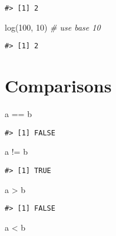 \documentclass[
]{book}
\newenvironment{Shaded}{\begin{snugshade}}{\end{snugshade}}
\newcommand{\CommentTok}[1]{\textcolor[rgb]{0.56,0.35,0.01}{\textit{#1}}}
\newcommand{\DecValTok}[1]{\textcolor[rgb]{0.00,0.00,0.81}{#1}}
\newcommand{\FunctionTok}[1]{\textcolor[rgb]{0.00,0.00,0.00}{#1}}
\newcommand{\NormalTok}[1]{#1}
\newcommand{\SpecialCharTok}[1]{\textcolor[rgb]{0.00,0.00,0.00}{#1}}
\begin{document}
\begin{verbatim}
#> [1] 2
\end{verbatim}

\begin{Shaded}
\begin{Highlighting}[]
\FunctionTok{log}\NormalTok{(}\DecValTok{100}\NormalTok{, }\DecValTok{10}\NormalTok{) }\CommentTok{\# use base 10}
\end{Highlighting}
\end{Shaded}

\begin{verbatim}
#> [1] 2
\end{verbatim}

\hypertarget{comparisons}{%
\section{Comparisons}\label{comparisons}}

\begin{Shaded}
\begin{Highlighting}[]
\NormalTok{a }\SpecialCharTok{==}\NormalTok{ b}
\end{Highlighting}
\end{Shaded}

\begin{verbatim}
#> [1] FALSE
\end{verbatim}

\begin{Shaded}
\begin{Highlighting}[]
\NormalTok{a }\SpecialCharTok{!=}\NormalTok{ b}
\end{Highlighting}
\end{Shaded}

\begin{verbatim}
#> [1] TRUE
\end{verbatim}

\begin{Shaded}
\begin{Highlighting}[]
\NormalTok{a }\SpecialCharTok{\textgreater{}}\NormalTok{ b}
\end{Highlighting}
\end{Shaded}

\begin{verbatim}
#> [1] FALSE
\end{verbatim}

\begin{Shaded}
\begin{Highlighting}[]
\NormalTok{a }\SpecialCharTok{\textless{}}\NormalTok{ b}
\end{Highlighting}
\end{Shaded}
\end{document}
